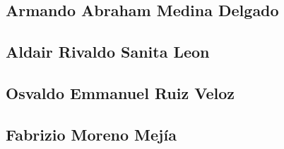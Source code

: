 \subsection{Armando Abraham Medina Delgado}
	
\subsection{Aldair Rivaldo Sanita Leon}
	
\subsection{Osvaldo Emmanuel Ruiz Veloz}
	
\subsection{Fabrizio Moreno Mejía}
	
